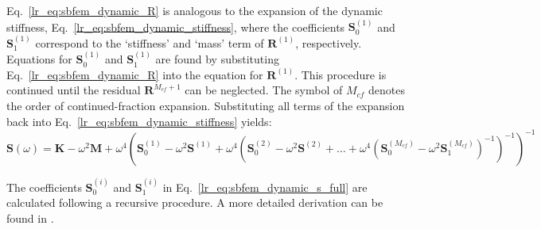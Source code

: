 Eq.~\ref{lr_eq:sbfem_dynamic_R} is analogous to the expansion of the dynamic stiffness, Eq.~\ref{lr_eq:sbfem_dynamic_stiffness}, where the coefficients $\mathbf{S}^{(1)}_0$ and $\mathbf{S}^{(1)}_1$ correspond to the `stiffness' and `mass' term of $\mathbf{R}^{(1)}$, respectively.
Equations for $\mathbf{S}^{(1)}_0$ and $\mathbf{S}^{(1)}_1$ are found by substituting Eq.~\ref{lr_eq:sbfem_dynamic_R} into the equation for $\mathbf{R}^{(1)}$.
This procedure is continued until the residual $\mathbf{R}^{M_{cf}+1}$ can be neglected.
The symbol of $M_{cf}$ denotes the order of continued-fraction expansion.
Substituting all terms of the expansion back into Eq.~\ref{lr_eq:sbfem_dynamic_stiffness} yields:
\begin{dmath}
    \mathbf{S}(\omega) =    \mathbf{K} - \omega^2 \mathbf{M} + \omega^4 \left(
                                \mathbf{S}_0^{(1)} - \omega^2 \mathbf{S}^{(1)} + \omega^4 \left(
                                    \mathbf{S}_0^{(2)} - \omega^2 \mathbf{S}^{(2)} + \dots + 
                                    \omega^4 \left(
                                        \mathbf{S}_0^{(M_{cf})} - \omega^2 \mathbf{S}_1^{(M_{cf})}
                                    \right)^{-1}
                                \right)^{-1}
                            \right)^{-1}
\label{lr_eq:sbfem_dynamic_s_full}
\end{dmath}

The coefficients $\mathbf{S}^{(i)}_0$ and $\mathbf{S}^{(i)}_1$ in Eq.~\ref{lr_eq:sbfem_dynamic_s_full} are calculated following a recursive procedure.
A more detailed derivation can be found in \citep{Song2009}.
